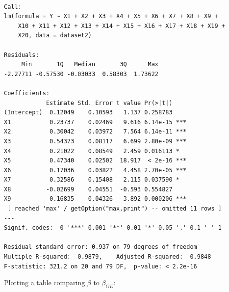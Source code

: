 \documentclass[
  letterpaper,
  DIV=11,
  numbers=noendperiod]{scrartcl}
\begin{document}
\begin{verbatim}

Call:
lm(formula = Y ~ X1 + X2 + X3 + X4 + X5 + X6 + X7 + X8 + X9 + 
    X10 + X11 + X12 + X13 + X14 + X15 + X16 + X17 + X18 + X19 + 
    X20, data = dataset2)

Residuals:
     Min       1Q   Median       3Q      Max 
-2.27711 -0.57530 -0.03033  0.58303  1.73622 

Coefficients:
            Estimate Std. Error t value Pr(>|t|)    
(Intercept)  0.12049    0.10593   1.137 0.258783    
X1           0.23737    0.02469   9.616 6.14e-15 ***
X2           0.30042    0.03972   7.564 6.14e-11 ***
X3           0.54373    0.08117   6.699 2.80e-09 ***
X4           0.21022    0.08549   2.459 0.016113 *  
X5           0.47340    0.02502  18.917  < 2e-16 ***
X6           0.17036    0.03822   4.458 2.70e-05 ***
X7           0.32586    0.15408   2.115 0.037590 *  
X8          -0.02699    0.04551  -0.593 0.554827    
X9           0.16835    0.04326   3.892 0.000206 ***
 [ reached 'max' / getOption("max.print") -- omitted 11 rows ]
---
Signif. codes:  0 '***' 0.001 '**' 0.01 '*' 0.05 '.' 0.1 ' ' 1

Residual standard error: 0.937 on 79 degrees of freedom
Multiple R-squared:  0.9879,    Adjusted R-squared:  0.9848 
F-statistic: 321.2 on 20 and 79 DF,  p-value: < 2.2e-16
\end{verbatim}

Plotting a table comparing \(\beta\) to \(\beta_{GD}\):
\end{document}
